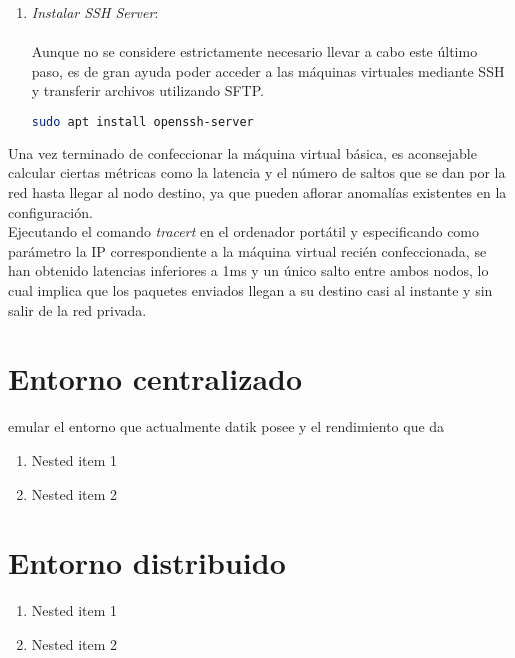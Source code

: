 \begin{enumerate}
	\item \textit{Instalar SSH Server}:\\\\Aunque no se considere estrictamente necesario llevar a cabo este último paso, es de gran ayuda poder acceder a las máquinas virtuales mediante SSH y transferir archivos utilizando SFTP.\\
	
	\begin{lstlisting}[language=bash]
	sudo apt install openssh-server
	\end{lstlisting}

\end{enumerate}

Una vez terminado de confeccionar la máquina virtual básica, es aconsejable calcular ciertas métricas como la latencia y el número de saltos que se dan por la red hasta llegar al nodo destino, ya que pueden aflorar anomalías existentes en la configuración.\\ 

Ejecutando el comando \textit{tracert} en el ordenador portátil y especificando como parámetro la IP correspondiente a la máquina virtual recién confeccionada, se han obtenido latencias inferiores a 1ms y un único salto entre ambos nodos, lo cual implica que los paquetes enviados llegan a su destino casi al instante y sin salir de la red privada.\\

\section{Entorno centralizado}

emular el entorno que actualmente datik posee y el rendimiento que da

\begin{enumerate}
	\item Nested item 1
	\item Nested item 2
\end{enumerate}


\section{Entorno distribuido}

\begin{enumerate}
	\item Nested item 1
	\item Nested item 2
\end{enumerate}


